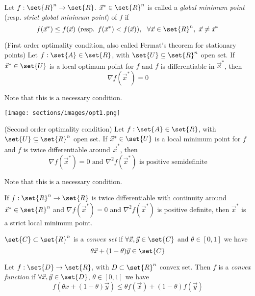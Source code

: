 \begin{definition}
    Let $f: \set{R}^n \rightarrow \set{R}$. $\vec{x}^* \in \set{R}^n$ is called a \textit{global minimum point} (resp. \textit{strict global minimum point}) of $f$ if
    $$ f(\vec{x}^*) \leq f(\vec{x})\ (\text{resp. } f(\vec{x}^*) < f(\vec{x})),\ \ \forall \vec{x} \in \set{R}^n,\ \vec{x} \neq \vec{x}^* $$
\end{definition}

\begin{theorem} (First order optimality condition, also called Fermat's theorem for stationary points)
    Let $f: \set{A} \in \set{R}$, with $\set{U} \subseteq \set{R}^n$ open set. If $\vec{x}^* \in \set{U}$ is a local optimum point for $f$ and $f$ is differentiable in $\vec{x}^*$, then
    $$ \nabla{f}(\vec{x}^*) = 0 $$
\end{theorem}
Note that this is a necessary condition.

\texttt{[image: sections/images/opt1.png]}


\begin{theorem} (Second order optimality condition)
    Let $f: \set{A} \in \set{R}$, with $\set{U} \subseteq \set{R}^n$ open set. If $\vec{x}^* \in \set{U}$ is a local minimum point for $f$ and $f$ is twice differentiable around $\vec{x}^*$, then
    $$ \nabla{f}(\vec{x}^*) = 0 \text{ and } \nabla^2{f}(\vec{x}^*) \text{ is positive semidefinite} $$
\end{theorem}
Note that this is a necessary condition.


\begin{theorem}
    If $f: \set{R}^n \rightarrow \set{R}$ is twice differentiable with continuity around $\vec{x}^* \in \set{R}^n$ and $\nabla{f}(\vec{x}^*) = 0$ and $\nabla^2{f}(\vec{x}^*)$ is positive definite, then $\vec{x}^*$ is a strict local minimum point.
\end{theorem}

\begin{definition}
    $\set{C} \subset \set{R}^n$ is a \textit{convex set} if $\forall\vec{x}, \vec{y} \in \set{C}$ and $\theta \in [0, 1]$ we have
    $$ \theta\vec{x} + (1 - \theta)\vec{y} \in \set{C} $$
\end{definition}

\begin{definition}
    Let $f: \set{D} \rightarrow \set{R}$, with $D \subset \set{R}^n$ convex set. Then $f$ is a \textit{convex function} if $\forall\vec{x}, \vec{y} \in \set{D}$, $\theta \in [0, 1]$ we have
    $$ f(\theta x + (1 - \theta)\vec{y}) \leq \theta f(\vec{x}) + (1 - \theta)f(\vec{y}) $$
\end{definition}

